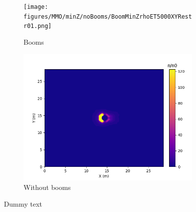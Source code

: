 \begin{center}
    \begin{figure}[H]
      \begin{subfigure}[b]{0.61\textwidth}
      \texttt{[image: figures/MMO/minZ/noBooms/BoomMinZrhoET5000XYRestr01.png]}
      \caption{Booms}
      \label{fig:PhiXBoomsMinZ}
    \end{subfigure}
    \begin{subfigure}[b]{0.61\textwidth}
      \includegraphics[width=\textwidth]{figures/MMO/minZ/noBooms/noBoomMinZrhoET5000XYRestr01.png}
      \caption{Without booms}
      \label{fig:PhiXnoBoomsMinZ}
    \end{subfigure}
  \label{fig:PhiXDriftMinZ}
  \caption{Dummy text}
  \end{figure}
\end{center}


